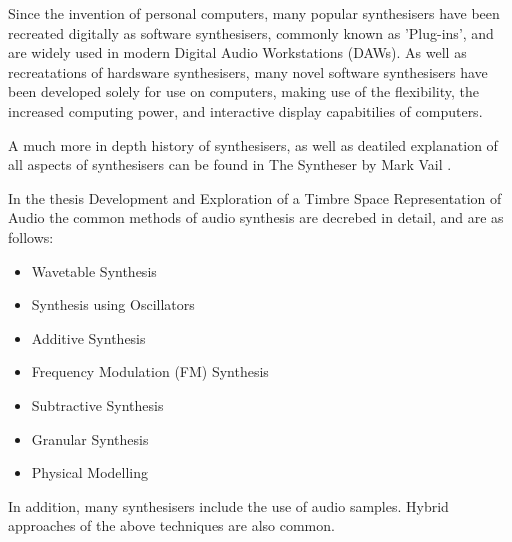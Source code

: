\documentclass[11pt, oneside]{report}   	%
\begin{document}
Since the invention of personal computers, many popular synthesisers have been recreated digitally as software synthesisers, commonly known as 'Plug-ins', and are widely used in modern Digital Audio Workstations (DAWs). As well as recreatations of hardsware synthesisers, many novel software synthesisers have been developed solely for use on computers, making use of the flexibility, the increased computing power, and interactive display capabitilies of computers. 

A much more in depth history of synthesisers, as well as deatiled explanation of all aspects of synthesisers can be found in The Syntheser by Mark Vail \cite{Synth}.

In the thesis Development and Exploration of a Timbre Space Representation of Audio \cite{SynthTypes} %
the common methods of audio synthesis are decrebed in detail, and are as follows:
\begin{itemize}
	\setlength\itemsep{-1.2em}
	\item Wavetable Synthesis
	\item Synthesis using Oscillators
	\item Additive Synthesis
	\item Frequency Modulation (FM) Synthesis
	\item Subtractive Synthesis
	\item Granular Synthesis
	\item Physical Modelling
\end{itemize}
In addition, many synthesisers include the use of audio samples. Hybrid approaches of the above techniques are also common.
\end{document}
